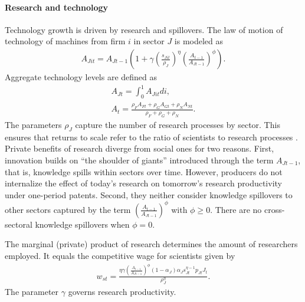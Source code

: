 \paragraph{Research and technology}
Technology growth is driven by research and spillovers. 
The law of motion of technology of machines from firm $i$ in sector $J$ is modeled as
\begin{align*}
A_{Jit}=A_{Jt-1}\left(1+\gamma\left(\frac{s_{Jit}}{\rho_J}\right)^\eta\left(\frac{A_{t-1}}{A_{Jt-1}}\right)^\phi\right).
\end{align*}
Aggregate technology levels are defined as
\begin{align*}
A_{Jt}=\int_{0}^{1}A_{Jit}di,\\
A_{t}=\frac{\rho_FA_{Ft}+\rho_GA_{Gt}+\rho_N A_{Nt}}{\rho_F+\rho_G+\rho_N}.
\end{align*}
The parameters $\rho_J$ capture the number of research processes by sector. This ensures that returns to scale refer to the ratio of scientists to research processes \citep{Fried2018ClimateAnalysis}. 
Private benefits of research diverge from social ones for two reasons. First, innovation builds on ``the shoulder of giants'' introduced through the term $A_{Jt-1}$, that is, knowledge spills within sectors over time. However, producers do not internalize the effect of today's research on tomorrow's research productivity under one-period patents.  Second, they neither consider knowledge spillovers to other sectors captured by the term $\left(\frac{A_{t-1}}{A_{Jt-1}}\right)^\phi$ with $\phi\geq0$. There are no cross-sectoral knowledge spillovers when $\phi=0$.

The marginal (private) product of research determines the amount of researchers employed. It equals the competitive wage for scientists given by
\begin{align*}
w_{st}= \frac{\eta \gamma \left(\frac{A_{t-1}}{A_{Jt-1}}\right)^\phi (1-\alpha_J)\alpha_Js_{Jt}^{\eta-1}p_{Jt}J_t}{\rho_J^\eta}.
\end{align*}
The parameter $\gamma$ governs research productivity.

